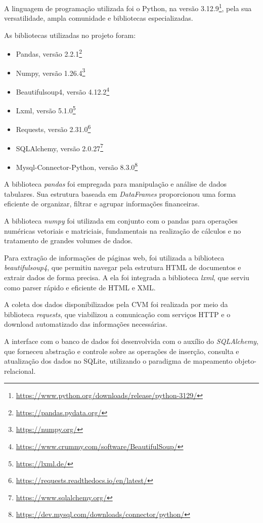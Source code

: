 A linguagem de programação utilizada foi o Python, na versão 3.12.9\footnote{\url{https://www.python.org/downloads/release/python-3129/}}, pela sua versatilidade, ampla comunidade e bibliotecas especializadas.

As bibliotecas utilizadas no projeto foram:

\begin{itemize}
	\item Pandas, versão 2.2.1\footnote{\url{https://pandas.pydata.org/}}
	\item Numpy, versão 1.26.4\footnote{\url{https://numpy.org/}}
	\item Beautifulsoup4, versão 4.12.2\footnote{\url{https://www.crummy.com/software/BeautifulSoup/}}
	\item Lxml, versão 5.1.0\footnote{\url{https://lxml.de/}}
	\item Requests, versão 2.31.0\footnote{\url{https://requests.readthedocs.io/en/latest/}}
	\item SQLAlchemy, versão 2.0.27\footnote{\url{https://www.sqlalchemy.org/}}
	\item Mysql-Connector-Python, versão 8.3.0\footnote{\url{https://dev.mysql.com/downloads/connector/python/}}
\end{itemize}

A biblioteca \textit{pandas} foi empregada para manipulação e análise de dados tabulares. Sua estrutura baseada em \textit{DataFrames} proporcionou uma forma eficiente de organizar, filtrar e agrupar informações financeiras.

A biblioteca \textit{numpy} foi utilizada em conjunto com o pandas para operações numéricas vetoriais e matriciais, fundamentais na realização de cálculos e no tratamento de grandes volumes de dados.

Para extração de informações de páginas web, foi utilizada a biblioteca \textit{beautifulsoup4}, que permitiu navegar pela estrutura HTML de documentos e extrair dados de forma precisa. A ela foi integrada a biblioteca \textit{lxml}, que serviu como parser rápido e eficiente de HTML e XML.

A coleta dos dados disponibilizados pela CVM foi realizada por meio da biblioteca \textit{requests}, que viabilizou a comunicação com serviços HTTP e o download automatizado das informações necessárias.

A interface com o banco de dados foi desenvolvida com o auxílio do \textit{SQLAlchemy}, que forneceu abstração e controle sobre as operações de inserção, consulta e atualização dos dados no SQLite, utilizando o paradigma de mapeamento objeto-relacional.

